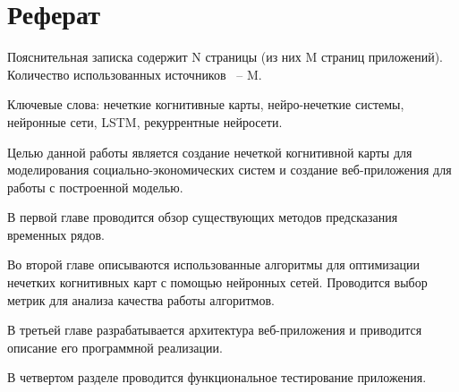 \chapter*{Реферат}
\thispagestyle{plain}

Пояснительная записка содержит N страницы (из них M страниц приложений). Количество использованных источников ~-- M.

Ключевые слова: нечеткие когнитивные карты, нейро-нечеткие системы, нейронные сети, LSTM, рекуррентные нейросети.

Целью данной работы является создание нечеткой когнитивной карты для моделирования
социально-экономических систем и создание веб-приложения для работы с построенной моделью.

В первой главе проводится обзор существующих методов предсказания временных рядов.

Во второй главе описываются использованные алгоритмы для оптимизации нечетких когнитивных карт с помощью нейронных сетей.
Проводится выбор метрик для анализа качества работы алгоритмов.

В третьей главе разрабатывается архитектура веб-приложения и приводится описание его программной реализации.

В четвертом разделе проводится функциональное тестирование приложения.
